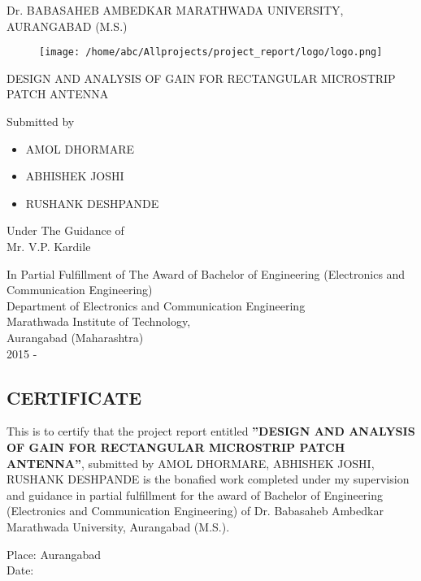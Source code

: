 \documentclass[12pt]{article}
\begin{document}
	\centering
    	Dr. BABASAHEB AMBEDKAR MARATHWADA UNIVERSITY, \\
	    AURANGABAD (M.S.)
	
	   \begin{figure}[h]
	   	\centering
	   	\texttt{[image: /home/abc/Allprojects/project\_report/logo/logo.png]}
	   \end{figure} 
		 {\large 	DESIGN AND ANALYSIS OF GAIN FOR RECTANGULAR MICROSTRIP PATCH ANTENNA }
	
	\begin{center}
		Submitted by \\ 
		
		\begin{itemize}
			\centering
			\item[]  AMOL DHORMARE 
			\item[] ABHISHEK JOSHI
			\item[]  RUSHANK DESHPANDE
		\end{itemize}
		
	  
		Under The Guidance of \\
		
		
		Mr. V.P. Kardile \\
		
	\end{center}
	
		 \small In Partial Fulfillment of The Award of  Bachelor of Engineering (Electronics and Communication Engineering)
		 \\
		 
		 \large{Department of Electronics and Communication Engineering} \\ 
		 
		 Marathwada Institute of Technology, \\
		 
		 Aurangabad (Maharashtra)
		 \\
		 
		2015 - \the\year
		 
	\thispagestyle{empty}
	\cleardoublepage
	
	
	\begin{center}
		\section*{CERTIFICATE}
		 \justify
		 
			This is to certify that the project report entitled {\large \textbf{''DESIGN AND ANALYSIS OF GAIN FOR RECTANGULAR MICROSTRIP PATCH ANTENNA''}}, submitted by AMOL DHORMARE, ABHISHEK JOSHI, RUSHANK DESHPANDE is the bonafied work completed under my supervision and guidance in partial fulfillment for the award of Bachelor of Engineering (Electronics and Communication Engineering) of Dr. Babasaheb Ambedkar Marathwada University,  Aurangabad (M.S.).
		
			Place: Aurangabad \\
			Date: 
	\end{center}
	
\end{document}
